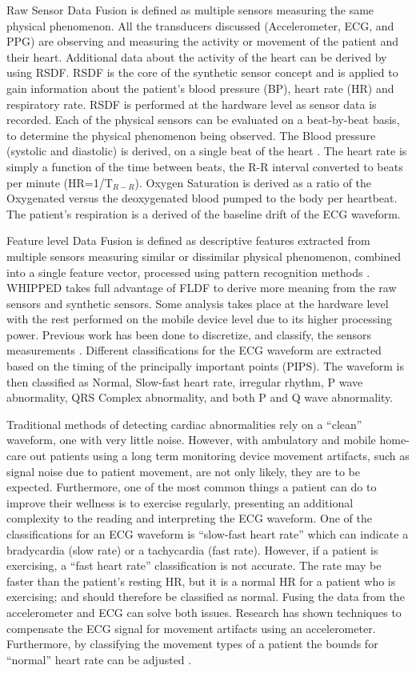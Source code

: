 Raw Sensor Data Fusion is defined as multiple sensors measuring the same physical phenomenon. All the transducers discussed (Accelerometer, ECG, and PPG) are observing and measuring the activity or movement of the patient and their heart. Additional data about the activity of the heart can be derived by using RSDF. RSDF is the core of the synthetic sensor concept and is applied to gain information about the patient's blood pressure (BP), heart rate (HR) and respiratory rate. RSDF is performed at the hardware level as sensor data is recorded. Each of the physical sensors can be evaluated on a beat-by-beat basis, to determine the physical phenomenon being observed. The Blood pressure (systolic and diastolic) is derived, on a single beat of the heart \cite{Poon2005}. The heart rate is simply a function of the time between beats, the R-R interval converted to beats per minute (HR=1/T$_{R-R}$). Oxygen Saturation is derived as a ratio of the Oxygenated versus the deoxygenated blood pumped to the body per heartbeat. The patient's respiration is a derived of the baseline drift of the ECG waveform. 

Feature level Data Fusion is defined as descriptive features extracted from multiple sensors measuring similar or dissimilar physical phenomenon, combined into a single feature vector,  processed using pattern recognition methods \cite{DaSilva2012}. WHIPPED takes full advantage of FLDF to derive more meaning from the raw sensors and synthetic sensors. Some analysis takes place at the hardware level with the rest performed on the mobile device level due to its higher processing power. Previous work has been done to discretize, and classify, the sensors measurements \cite{Chaiyasucheeva2012} \cite{DaSilva2012}. Different classifications for the ECG waveform are extracted based on the timing of the principally important points (PIPS).  The waveform is then classified as Normal, Slow-fast heart rate, irregular rhythm, P wave abnormality, QRS Complex abnormality, and both P and Q wave abnormality. 

Traditional methods of detecting cardiac abnormalities rely on a “clean” waveform, one with very little noise. However, with ambulatory and mobile home-care out patients using a long term monitoring device movement artifacts, such as signal noise due to patient movement, are not only likely, they are to be expected. Furthermore, one of the most common things a patient can do to improve their wellness is to exercise regularly, presenting an additional complexity to the reading and interpreting the ECG waveform. One of the classifications for an ECG waveform is “slow-fast heart rate” which can indicate a bradycardia (slow rate) or a tachycardia (fast rate). However, if a patient is exercising, a “fast heart rate” classification is not accurate. The rate may be faster than the patient's resting HR, but it is a normal HR for a patient who is exercising; and should therefore be classified as normal. Fusing the data from the accelerometer and ECG can solve both issues. Research has shown techniques to compensate the ECG signal for movement artifacts using an accelerometer. Furthermore, by classifying the movement types of a patient the bounds for “normal” heart rate can be adjusted \cite{Shannon2012}.

